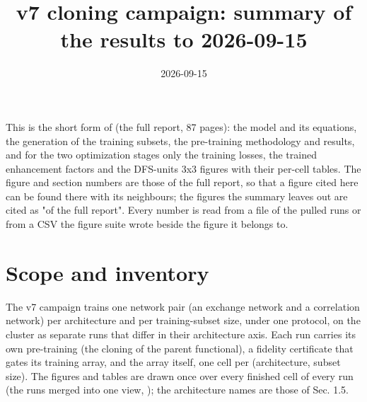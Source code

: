 \documentclass[10pt,a4paper]{article}
\begin{document}
\title{v7 cloning campaign: summary of the results to 2026-09-15}
\author{}\date{2026-09-15}
\maketitle


This is the short form of  (the full report, 87 pages): the model and its equations, the generation of the training subsets, the pre-training methodology and results, and for the two optimization stages only the training losses, the trained enhancement factors and the DFS-units 3x3 figures with their per-cell tables. The figure and section numbers are those of the full report, so that a figure cited here can be found there with its neighbours; the figures the summary leaves out are cited as "of the full report". Every number is read from a file of the pulled runs or from a CSV the figure suite wrote beside the figure it belongs to.

\section*{Scope and inventory}

The v7 campaign trains one network pair (an exchange network and a correlation network) per architecture and per training-subset size, under one protocol, on the cluster as separate runs that differ in their architecture axis. Each run carries its own pre-training (the cloning of the parent functional), a fidelity certificate that gates its training array, and the array itself, one cell per (architecture, subset size). The figures and tables are drawn once over every finished cell of every run (the runs merged into one view, ); the architecture names are those of Sec. 1.5.
\end{document}
